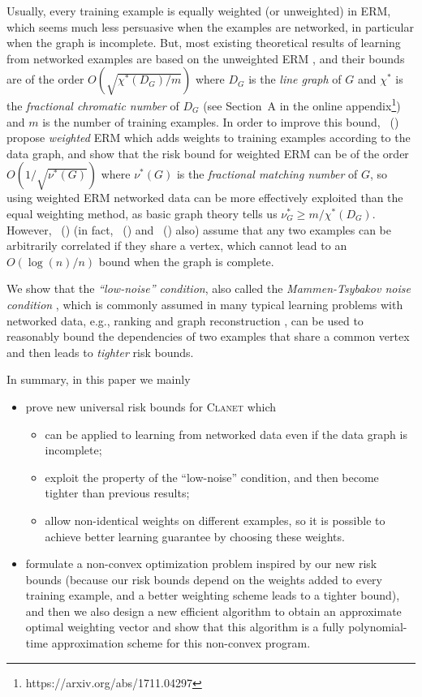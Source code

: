 \documentclass[letterpaper]{article} %
\newcommand{\problemabbr}{\textnormal{C}\textsc{lanet}}
\newcommand{\citet}[1]{\citeauthor{#1}\ (\citeyear{#1})}
\begin{document}
Usually, every training example is equally weighted (or unweighted) in ERM, which seems much less persuasive when the examples are networked, in particular when the graph is incomplete. But, most existing theoretical results of learning from networked examples are based on the unweighted ERM \cite{Usunier2005,ralaivola2009chromatic}, and their bounds are of the order $O(\sqrt{\chi^*(D_G)/m})$ where $D_G$ is the \emph{line graph} of $G$ and $\chi^*$ is the \emph{fractional chromatic number} of $D_G$ (see Section~A in the online appendix\footnote{https://arxiv.org/abs/1711.04297}) and $m$ is the number of training examples. 
In order to improve this bound, \citet{wang2017learning} propose \emph{weighted} ERM %
which adds weights to training examples 
according to the data graph, and show that the risk bound for weighted ERM can be of the order $O(1/\sqrt{\nu^*(G)})$ where $\nu^*(G)$ is the \emph{fractional matching number} of $G$, so using weighted ERM networked data can be more effectively exploited than the equal weighting method, as basic graph theory tells us $\nu^*_G\ge m / \chi^*(D_G)$. 
However, \citet{wang2017learning} (in fact, \citet{Usunier2005} and \citet{ralaivola2009chromatic} also) assume that any two examples can be arbitrarily correlated if they share a vertex, which cannot lead to an $O(\log(n)/n)$ bound when the graph is complete. 

We show that the \emph{``low-noise'' condition}, also called the \emph{Mammen-Tsybakov noise condition}  \cite{Mammen1998Smooth}, which is commonly assumed in many typical learning problems with networked data, e.g., ranking \cite{clemenccon2008ranking} and graph reconstruction \cite{papa2016graph}, can be used to reasonably bound the dependencies of two examples that share a common vertex and then leads to \emph{tighter} risk bounds. 

In summary, in this paper we mainly 
\begin{itemize}
\item prove new universal risk bounds for \problemabbr{} which
\begin{itemize}
\item can be applied to learning from networked data even if the data graph is incomplete; 
\item exploit the property of the ``low-noise'' condition, and then become tighter than previous results; 
\item allow non-identical weights on different examples, so it is possible to achieve better learning guarantee by choosing these weights.
\end{itemize}
\item formulate a non-convex optimization problem inspired by our new risk bounds (because our risk bounds depend on the weights added to every training example, and a better weighting scheme leads to a tighter bound), and then we also design a new efficient algorithm to obtain an approximate optimal weighting vector and show that this algorithm is a fully polynomial-time approximation scheme for this non-convex program. 
\end{itemize}
\end{document}
